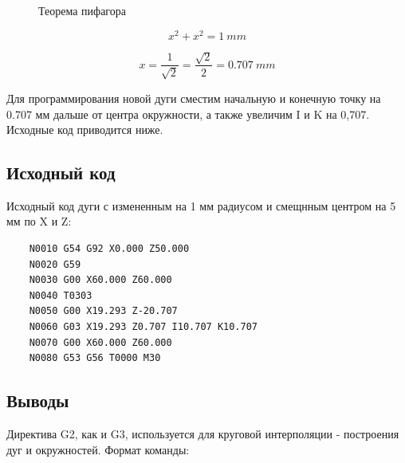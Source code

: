 \begin{figure}[ht]
\centering
{}
\caption{Теорема пифагора\label{fig:pifagor}}
\end{figure}


\begin{equation}
    x^2 + x^2 = 1~mm
\end{equation}

\begin{equation}
    x = \frac{1}{\sqrt{2}} = \frac{\sqrt{2}}{2} = 0.707~mm
\end{equation}

Для программирования новой дуги сместим начальную и конечную точку на 0.707 мм дальше от центра окружности, а также увеличим I и K на 0,707. Исходные код приводится ниже.

\subsection*{Исходный код}

Исходный код дуги с измененным на 1 мм радиусом и смещнным центром на 5 мм по X и Z:

\begin{verbatim}
	N0010 G54 G92 X0.000 Z50.000
	N0020 G59
	N0030 G00 X60.000 Z60.000
	N0040 T0303
	N0050 G00 X19.293 Z-20.707
	N0060 G03 X19.293 Z0.707 I10.707 K10.707
	N0070 G00 X60.000 Z60.000
	N0080 G53 G56 T0000 M30
\end{verbatim}

\subsection*{Выводы}

Директива G2, как и G3, используется для круговой интерполяции - построения дуг и окружностей. Формат команды:

